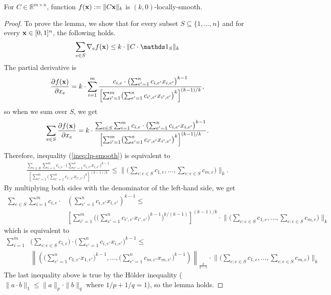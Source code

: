 \begin{lemma} \label{lem-makespan}
For $C \in \mathbb{R}^{m \times n}$, function $f(\mathbf{x}) := \|C \mathbf{x}\|_{k}$ is $(k,0)$-locally-smooth.
\end{lemma}
%
\begin{proof}
To prove the lemma, we show that for every subset $S \subseteq \{1, \ldots, n\}$ and for every $\mathbf{x} \in [0,1]^{n}$, the following holds.
%
\begin{align}	\label{ineq:lp-smooth}
\sum_{e \in S} \nabla_{e} f(\vect{x}) \leq  k \cdot \|C \cdot \one_{S}\|_{k}
\end{align}
%
The partial derivative is
%
\begin{align*}
\frac{\partial f(\mathbf{x})}{\partial x_{e}}
= k \cdot \sum_{i = 1}^{m} \frac{c_{i,e} \cdot \bigl( \sum_{e' = 1}^{n} c_{i,e'} x_{i,e'} \bigr)^{k-1} }{ \left[ \sum_{i' = 1}^{m}
		\bigl( \sum_{e'= 1}^{n} c_{i',e'} x_{i',e'} \bigr)^{k} \right]^{(k-1)/k}},
\end{align*}
so when we sum over $S$, we get
\begin{align*}
\sum_{e \in S} \frac{\partial f(\mathbf{x})}{\partial x_{e}}
= k \cdot \frac{ \sum_{e \in S} \sum_{i = 1}^{m} c_{i,e} \cdot \bigl( \sum_{e' = 1}^{n} c_{i,e'} x_{i,e'} \bigr)^{k-1} }{ \left[ \sum_{i' = 1}^{m} \bigl( \sum_{e'= 1}^{n} c_{i',e'} x_{i',e'} \bigr)^{k} \right]^{(k-1)/k}}.
\end{align*}
%
Therefore, inequality (\ref{ineq:lp-smooth}) is equivalent to
\begin{align*}
\frac{ \sum_{e \in S} \sum_{i = 1}^{m} c_{i,e} \cdot \bigl( \sum_{e' = 1}^{n} c_{i,e'} x_{i,e'} \bigr)^{k-1} }{ \left[ \sum_{i' = 1}^{m} \bigl( \sum_{e'= 1}^{n} c_{i',e'} x_{i',e'} \bigr)^{k} \right]^{(k-1)/k}}
	\leq   \biggl \| \biggl( \sum_{e: e \in S} c_{1,e}, \ldots , \sum_{e: e \in S} c_{m,e}  \biggr) \biggr \|_{k}.
\end{align*}
%
By multiplying both sides with the denominator of the left-hand side, we get
%
\begin{align*}
    \sum_{e \in S} \sum_{i = 1}^{m} c_{i,e} \cdot & \left( \sum_{e' = 1}^{n} c_{i,e'} x_{i,e'} \right)^{k-1} \leq \\
    & \left[ \sum_{i'=1}^{m} \biggl( \biggl( \sum_{e'= 1}^{n} c_{i',e'} x_{i',e'} \biggr)^{k-1} \biggr)^{k/(k-1)} \right]^{(k-1)/k}
    	\cdot \biggl \| \biggl( \sum_{e: e \in S} c_{1,e}, \ldots , \sum_{e: e \in S} c_{m,e}  \biggr) \biggr \|_{k}
\end{align*}
which is equivalent to
\begin{align*}
    \sum_{i=1}^{m} & \biggl( \sum_{e: e \in S} c_{i,e} \biggr) \cdot \biggl( \sum_{e'=1}^{n} c_{i,e'} x_{i,e'} \biggr)^{k-1} \leq \\
    & \left \| \left( \biggl( \sum_{e'=1}^{n} c_{1,e'} x_{1,e'} \biggr)^{k-1}, \ldots, \biggl( \sum_{e'=1}^{n} c_{m,e'} x_{m,e'} \biggr)^{k-1} \right) \right \|_{\frac{k}{k-1}}
    		\cdot \biggl \| \biggl( \sum_{e: e \in S} c_{1,e}, \ldots , \sum_{e: e \in S} c_{m,e}  \biggr) \biggr \|_{k}
\end{align*}
The last inequality above is true by the H\"older inequality ($\| a \cdot b\|_{1} \leq \| a \|_{p} \cdot \| b \|_{q}$ where $1/p + 1/q = 1$), so the lemma holds.
\end{proof}

